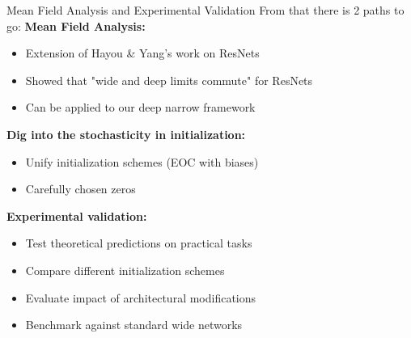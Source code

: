 \documentclass{beamer}
\begin{document}
\begin{frame}{Mean Field Analysis and Experimental Validation}
    From that there is 2 paths to go:
\textbf{Mean Field Analysis:}
\begin{itemize}
\item Extension of Hayou \& Yang's work on ResNets
\item Showed that "wide and deep limits commute" for ResNets
\item Can be applied to our deep narrow framework
\end{itemize}


\textbf{Dig into the stochasticity in initialization:}
\begin{itemize}
\item Unify initialization schemes (EOC with biases)
\item Carefully chosen zeros
\end{itemize}

\textbf{Experimental validation:}
\begin{itemize}
\item Test theoretical predictions on practical tasks
\item Compare different initialization schemes
\item Evaluate impact of architectural modifications
\item Benchmark against standard wide networks
\end{itemize}
\end{frame}
\end{document}
